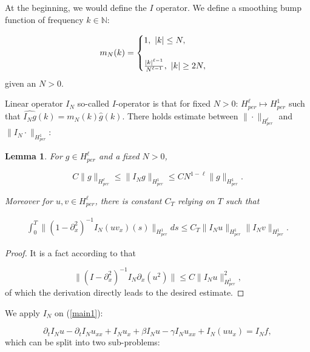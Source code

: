 \documentclass[10pt,a4paper,final]{article}
\numberwithin{equation}{section}
\newtheorem{lemma}[theorem]{Lemma}
\begin{document}
At the beginning, we would define the $I$ operator. We define a smoothing bump function of frequency $k\in\mathbb{N}:$

\begin{eqnarray*}
{m_N}(k) = 
\begin{cases}
1, \,\,|k|\le N,\\\\
{|k|^{\ell-1}\over N^{\ell-1}}, \,\, |k|\ge 2N,
\end{cases}
\end{eqnarray*}
given an $N>0$. %


Linear operator $I_N$ so-called $I$-operator is that for fixed $N>0$: $H_{per}^\ell\mapsto H_{per}^1$ such that $\widehat{I_N g}(k) = m_N(k)\widehat g(k)$. There holds estimate between $\|\cdot\|_{H^{\ell}_{per}}$ and $\|I_N\cdot\|_{H^1_{per}}$:

\begin{lemma}\label{le5-2}
For $g\in H_{per}^\ell$ and a fixed $N>0$, 

$$C\|g\|_{H_{per}^\ell}\le\|I_Ng\|_{H_{per}^1}\le CN^{1-\ell}\|g\|_{H_{per}^1}.$$

Moreover for $u, v\in H_{per}^\ell$, there is constant $C_T$ relying on $T$ such that

\begin{eqnarray*}
\int_0^T\|(1-\partial^2_{x})^{-1}I_N(uv_x)(s)\|_{H_{per}^1}ds\le C_T\|I_Nu\|_{H_{per}^1}\|I_Nv\|_{H_{per}^1}.
\end{eqnarray*}
\end{lemma}
\begin{proof} It is a fact according to \cite{MWang2} that

$$\|(I-\partial^2_{x})^{-1}I_N\partial_x(u^2) \|\le C\|I_Nu\|^2_{H_{per}^1},$$
of which the derivation directly leads to the desired estimate.
\end{proof}


We apply $I_N$ on (\ref{main1}):

$$\partial_t I_Nu-\partial_t I_Nu_{xx}+I_Nu_x+\beta I_Nu -\gamma I_Nu_{xx}+I_N(uu_x) = I_Nf,$$
which can be split into two sub-problems:
\end{document}

